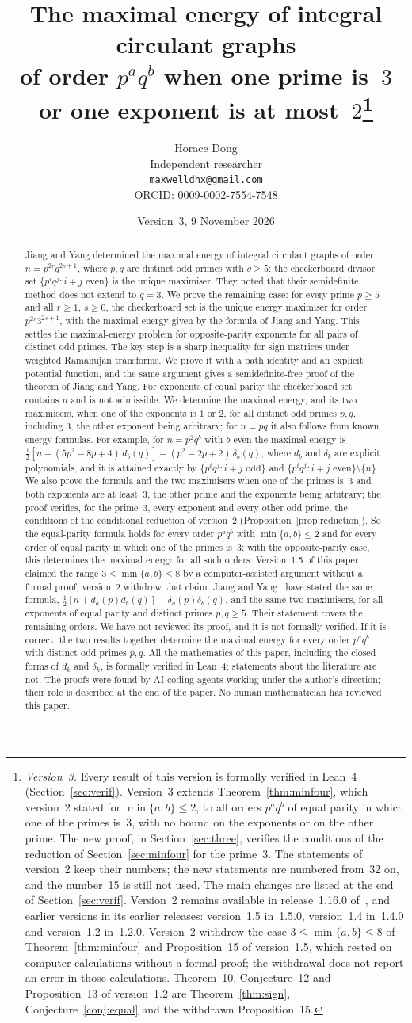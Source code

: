 \documentclass[11pt]{article}
\title{The maximal energy of integral circulant graphs\\ of order $p^aq^b$
when one prime is~$3$\\ or one exponent is at most~$2$\thanks{\emph{Version~3.} Every result of
this version is formally verified in Lean~4 (Section~\ref{sec:verif}). Version~3
extends Theorem~\ref{thm:minfour}, which version~2 stated for $\min\{a,b\}\le2$, to
all orders $p^aq^b$ of equal parity in which one of the primes is~$3$, with no bound
on the exponents or on the other prime. The new proof, in Section~\ref{sec:three},
verifies the conditions of the reduction of Section~\ref{sec:minfour} for the
prime~$3$. The statements of version~2 keep their numbers; the new statements are
numbered from~32 on, and the number~15 is still not used. The main changes are
listed at the end of Section~\ref{sec:verif}. Version~2 remains available in
release~1.16.0 of~\cite{repo}, and earlier versions in its earlier releases:
version~1.5 in~1.5.0, version~1.4 in~1.4.0 and version~1.2 in~1.2.0. Version~2
withdrew the case $3\le\min\{a,b\}\le8$ of Theorem~\ref{thm:minfour} and
Proposition~15 of version~1.5, which rested on computer calculations without a
formal proof; the withdrawal does not report an error in those calculations.
Theorem~10, Conjecture~12 and Proposition~13 of version~1.2 are
Theorem~\ref{thm:sign}, Conjecture~\ref{conj:equal} and the withdrawn
Proposition~15.}}
\author{Horace Dong\\ \small Independent researcher\\
\small\texttt{maxwelldhx@gmail.com}\\
\small ORCID: \href{https://orcid.org/0009-0002-7554-7548}{0009-0002-7554-7548}}
\date{Version~3, 9 November 2026}
\theoremstyle{remark}
\begin{document}
\maketitle
\begin{abstract}
Jiang and Yang determined the maximal energy of integral circulant graphs of
order $n=p^{2r}q^{2s+1}$, where $p,q$ are distinct odd primes with $q\ge5$:
the checkerboard divisor set $\{p^iq^j: i+j \text{ even}\}$ is the unique
maximiser. They noted that their semidefinite method does not extend to
$q=3$. We prove the remaining case: for every prime $p\ge5$ and all $r\ge1$,
$s\ge0$, the checkerboard set is the unique energy maximiser for order
$p^{2r}3^{2s+1}$, with the maximal energy given by the formula of Jiang and
Yang. This settles the maximal-energy problem for opposite-parity exponents
for all pairs of distinct odd primes. The key step is a sharp inequality for
sign matrices under weighted Ramanujan transforms. We prove it with a path
identity and an explicit potential function, and the same argument gives a
semidefinite-free proof of the theorem of Jiang and Yang. For exponents of
equal parity the checkerboard set contains $n$ and is not admissible. We
determine the maximal energy, and its two maximisers, when one of the exponents
is $1$ or $2$, for all distinct odd primes $p,q$, including $3$, the other
exponent being arbitrary; for $n=pq$ it also follows from known energy formulas.
For example, for $n=p^2q^b$ with $b$ even the maximal energy is
$\frac12[n+(5p^2-8p+4)\,d_b(q)]-(p^2-2p+2)\,\delta_b(q)$, where $d_b$ and
$\delta_b$ are explicit polynomials, and it is attained exactly by
$\{p^iq^j: i+j\text{ odd}\}$ and $\{p^iq^j: i+j\text{ even}\}\setminus\{n\}$.
We also prove the formula and the two maximisers when one of the primes is~$3$
and both exponents are at least~$3$, the other prime and the exponents being
arbitrary; the proof verifies, for the prime~$3$, every exponent and every other odd prime,
the conditions of the conditional reduction of version~2
(Proposition~\ref{prop:reduction}). So the equal-parity formula holds for every order $p^aq^b$
with $\min\{a,b\}\le2$ and for every order of equal parity in which one of the
primes is~$3$; with the opposite-parity case, this determines the maximal energy
for all such orders. Version~1.5 of this paper claimed the range
$3\le\min\{a,b\}\le8$ by a computer-assisted argument without a formal proof;
version~2 withdrew that claim. Jiang and Yang~\cite{jy2} have stated the same
formula, $\frac12[n+d_a(p)d_b(q)]-\delta_a(p)\delta_b(q)$, and the same two
maximisers, for all exponents of equal parity and distinct primes $p,q\ge5$. Their
statement covers the remaining orders. We have not reviewed its proof, and it is
not formally verified. If it is correct, the two results together determine the
maximal energy for every order $p^aq^b$ with distinct odd primes $p,q$. All the
mathematics of this paper,
including the closed forms of $d_k$ and $\delta_k$, is formally verified in
Lean~4; statements about the literature are not. The proofs were found by AI
coding agents working under the author's direction; their role is described at
the end of the paper. No human mathematician has reviewed this paper.
\end{abstract}
\end{document}
